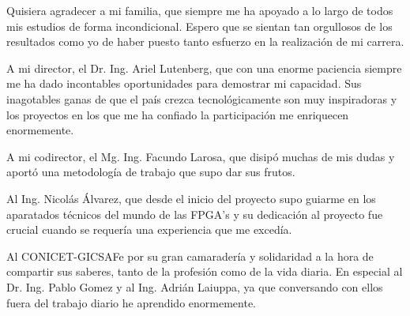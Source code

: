 \documentclass[
11pt, %
spanish,
singlespacing, %
parskip, %
headsepline, %
]{MastersDoctoralThesis} %
\renewcommand{\listtablename}{Índice de Tablas}
\begin{document}
\begin{acknowledgements}
\vspace{1.5cm}

Quisiera agradecer a mi familia, que siempre me ha apoyado a lo largo de todos mis estudios de forma incondicional. Espero que se sientan tan orgullosos de los resultados como yo de haber puesto tanto esfuerzo en la realización de mi carrera.

A mi director, el Dr. Ing. Ariel Lutenberg, que con una enorme paciencia siempre me ha dado incontables oportunidades para demostrar mi capacidad. Sus inagotables ganas de que el país crezca tecnológicamente son muy inspiradoras y los proyectos en los que me ha confiado la participación me enriquecen enormemente.

A mi codirector, el Mg. Ing. Facundo Larosa, que disipó muchas de mis dudas y aportó una metodología de trabajo que supo dar sus frutos.

Al Ing. Nicolás Álvarez, que desde el inicio del proyecto supo guiarme en los aparatados técnicos del mundo de las FPGA's y su dedicación al proyecto fue crucial cuando se requería una experiencia que me excedía.

Al CONICET-GICSAFe por su gran camaradería y solidaridad a la hora de compartir sus saberes, tanto de la profesión como de la vida diaria. En especial al Dr. Ing. Pablo Gomez y al Ing. Adrián Laiuppa, ya que conversando con ellos fuera del trabajo diario he aprendido enormemente.

\end{acknowledgements}

\renewcommand{\listtablename}{Índice de Tablas}

\tableofcontents %

\listoffigures %

\listoftables %


\end{document}
